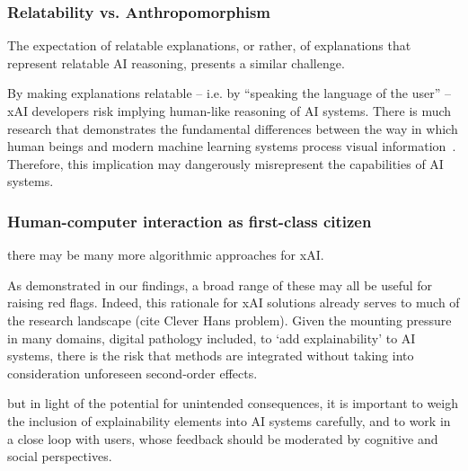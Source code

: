 \subsubsection{Relatability vs. Anthropomorphism}

The expectation of relatable explanations, or rather, of explanations that represent relatable AI reasoning, presents a similar challenge. 

By making explanations relatable -- i.e. by ``speaking the language of the user'' -- xAI developers risk implying human-like reasoning of AI systems. There is much research that demonstrates the fundamental differences between the way in which human beings and modern machine learning systems process visual information~\cite{geirhos2020shortcut}. Therefore, this implication may dangerously misrepresent the capabilities of AI systems.





\subsubsection{Human-computer interaction as first-class citizen}
there may be many more algorithmic approaches for xAI. 

As demonstrated in our findings, a broad range of these may all be useful for raising red flags. Indeed, this rationale for xAI solutions already serves to much of the research landscape (cite Clever Hans problem). Given the mounting pressure in many domains, digital pathology included, to `add explainability' to AI systems, there is the risk that methods are integrated without taking into consideration unforeseen second-order effects. 

but in light of the potential for unintended consequences, it is important to weigh the inclusion of explainability elements into AI systems carefully, and to work in a close loop with users, whose feedback should be moderated by cognitive and social perspectives. 


